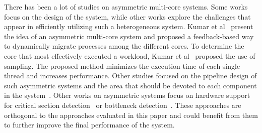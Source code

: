 There has been a lot of studies on asymmetric multi-core systems. Some works focus on the design of the system, while other works explore the challenges that appear in efficiently utilizing such a heterogeneous system.
Kumar et al~\cite{Kumar_micro_2003} present the idea of an asymmetric multi-core system and proposed a feedback-based way to dynamically migrate processes among the different cores. 
To determine the core that most effectively executed a workload, Kumar et al~\cite{Kumar:ISCA2004} proposed the use of sampling. The proposed method minimizes the execution time of each single thread and increases performance. Other studies focused on the pipeline design of such asymmetric systems and the area that should be devoted to each component in the system~\cite{Balakrishnan:ISCA2005, Morad_area_based}. Other works on asymmetric systems focus on hardware support for critical section detection~\cite{Suleman:APLOS2009} or bottleneck detection~\cite{Joao:ASPLOS2012,Joao:ISCA2013}.
These approaches are orthogonal to the approaches evaluated in this paper and could benefit from them to further improve the final performance of the system.

